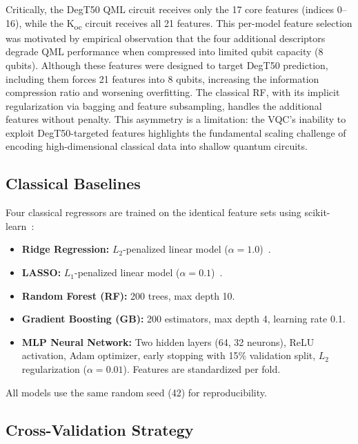 \documentclass[12pt,a4paper]{article}
\newcommand{\degtl}{DegT50}
\newcommand{\koc}{K\textsubscript{oc}}
\begin{document}
Critically, the \degtl{} QML circuit receives only the 17 core features
(indices 0--16), while the \koc{} circuit receives all 21 features.
This per-model feature selection was motivated by empirical observation
that the four additional descriptors degrade QML performance
when compressed into limited qubit capacity (8 qubits). Although
these features were designed to target DegT50 prediction, including them
forces 21 features into 8 qubits, increasing the information compression
ratio and worsening overfitting. The classical RF, with its implicit
regularization via bagging and feature subsampling, handles the additional
features without penalty. This asymmetry is a limitation: the VQC's
inability to exploit DegT50-targeted features highlights the fundamental
scaling challenge of encoding high-dimensional classical data into
shallow quantum circuits.


\subsection{Classical Baselines}
\label{sec:baselines}

Four classical regressors are trained on the identical feature sets
using scikit-learn~\cite{sklearn2011}:

\begin{itemize}[nosep]
  \item \textbf{Ridge Regression:} $L_2$-penalized linear model
        ($\alpha = 1.0$)~\cite{hoerl1970}.
  \item \textbf{LASSO:} $L_1$-penalized linear model
        ($\alpha = 0.1$)~\cite{tibshirani1996}.
  \item \textbf{Random Forest (RF):} 200 trees, max depth 10.
  \item \textbf{Gradient Boosting (GB):} 200 estimators, max depth 4,
        learning rate 0.1.
  \item \textbf{MLP Neural Network:} Two hidden layers (64, 32 neurons),
        ReLU activation, Adam optimizer, early stopping with 15\%
        validation split, $L_2$ regularization ($\alpha = 0.01$).
        Features are standardized per fold.
\end{itemize}

All models use the same random seed (42) for reproducibility.


\subsection{Cross-Validation Strategy}
\label{sec:cv}
\end{document}
